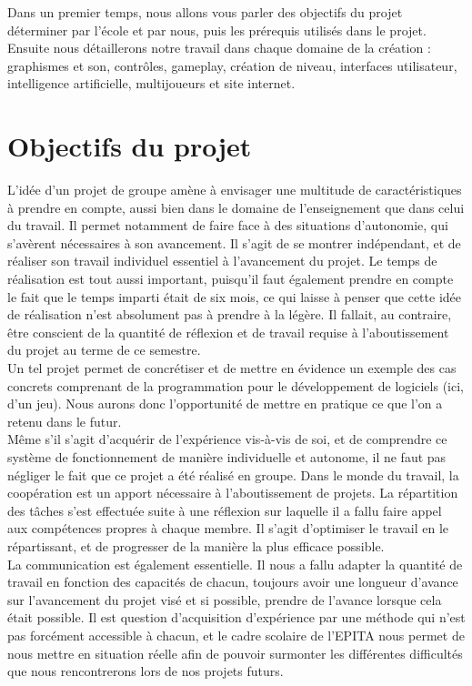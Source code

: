 \documentclass[12pt, titlepage]{article}
\begin{document}
\begin{spacing}{1.5}
Dans un premier temps, nous allons vous parler des objectifs du projet déterminer par l'école et par nous, puis les prérequis utilisés dans le projet. Ensuite nous détaillerons notre travail dans chaque domaine de la création : graphismes et son, contrôles, gameplay, création de niveau, interfaces utilisateur, intelligence artificielle, multijoueurs et site internet.

\newpage
\section{Objectifs du projet}

L'idée d'un projet de groupe amène à envisager une multitude de caractéristiques à prendre en compte, aussi bien dans le domaine de l'enseignement que dans celui du travail. Il permet notamment de faire face à des situations d'autonomie, qui s'avèrent nécessaires à son avancement. Il s'agit de se montrer indépendant, et de réaliser son travail individuel essentiel à l'avancement du projet. Le temps de réalisation est tout aussi important, puisqu'il faut également prendre en compte le fait que le temps imparti était de six mois, ce qui laisse à penser que cette idée de réalisation n'est absolument pas à prendre à la légère. Il fallait, au contraire, être conscient de la quantité de réflexion et de travail requise à l'aboutissement du projet au terme de ce semestre.\\

Un tel projet permet de concrétiser et de mettre en évidence un exemple des cas concrets comprenant de la programmation pour le développement de logiciels (ici, d’un jeu). Nous aurons donc l'opportunité de mettre en pratique ce que l’on a retenu dans le futur.\\

Même s'il s'agit d'acquérir de l'expérience vis-à-vis de soi, et de comprendre ce système de fonctionnement de manière individuelle et autonome, il ne faut pas négliger le fait que ce projet a été réalisé en groupe. Dans le monde du travail, la coopération est un apport nécessaire à l'aboutissement de projets. La répartition des tâches s’est effectuée suite à une réflexion sur laquelle il a fallu faire appel aux compétences propres à chaque membre. Il s'agit d'optimiser le travail en le répartissant, et de progresser de la manière la plus efficace possible.\\

La communication est également essentielle. Il nous a fallu adapter la quantité de travail en fonction des capacités de chacun, toujours avoir une longueur d'avance sur l'avancement du projet visé et si possible, prendre de l'avance lorsque cela était possible. Il est question d'acquisition d'expérience par une méthode qui n'est pas forcément accessible à chacun, et le cadre scolaire de l'EPITA nous permet de nous mettre en situation réelle afin de pouvoir surmonter les différentes difficultés que nous rencontrerons lors de nos projets futurs.\\


\end{spacing}
\end{document}
